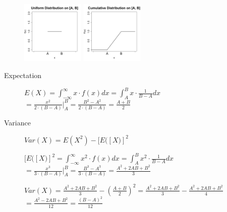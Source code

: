 \documentclass[10pt,landscape]{article}
\begin{document}
\begin{multicols}{3}
\begin{description}
\begin{minipage}{\linewidth}
  \centering
  \includegraphics[width=3cm]{W203_Unit_Summary-uniform_pmf}
  \includegraphics[width=3cm]{W203_Unit_Summary-uniform_cdf}
\end{minipage}


\item[Expectation] \quad
\begin{center}
$E(X) = \int_{-\infty}^{\infty}x \cdot f(x)dx = \int_{A}^{B}x \cdot \frac{1}{B-A}dx$ \\
$= \frac{x^2}{2\cdot(B-A)}\bigg\rvert_{A}^{B}=\frac{B^2-A^2}{2 \cdot(B-A)} = \frac{A+B}{2}$
\end{center}
\item[Variance] \quad
\begin{center}
$Var(X) = E(X^2) - [E([X)]^2$
\end{center}
\begin{center}
$[E([X)]^2 = \int_{-\infty}^{\infty}x^2 \cdot f(x)dx = \int_{A}^{B}x^2 \cdot \frac{1}{B-A}dx$ \\
$= \frac{x^3}{3\cdot(B-A)}\bigg\rvert_{A}^{B}=\frac{B^3-A^3}{3 \cdot(B-A)} = \frac{A^2+2AB+B^2}{3}$
\end{center}
\begin{center}
$Var(X) = \frac{A^2+2AB+B^2}{3} - (\frac{A+B}{2})^2 = \frac{A^2+2AB+B^2}{3} - \frac{A^2+2AB+B^2}{4}$
$= \frac{A^2-2AB+B^2}{12} = \frac{(B-A)^2}{12}$
\end{center}
\end{description}


\end{multicols}
\end{document}
